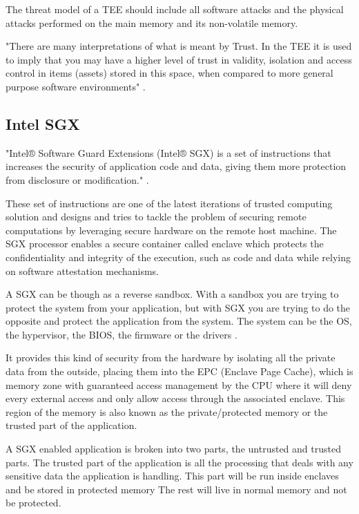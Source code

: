 The threat model of a \gls{TEE} should include all software attacks and the physical attacks performed on the main memory and its non-volatile memory.

"There are many interpretations of what is meant by Trust. In the \gls{TEE} it is used to imply that you may have a higher level of trust in validity, isolation and access control in items (assets) stored in this space, when compared to more general purpose software environments" \cite{tee:1}.

\subsection{Intel SGX} %
\label{ssec:Intel_sgx}


"Intel® Software Guard Extensions (Intel® SGX) is a set of instructions that increases the security of application code and data, giving them more protection from disclosure or modification." \cite{sgx:3}.

These set of instructions are one of the latest iterations of trusted computing solution and designs and tries to tackle the problem of securing remote computations by leveraging secure hardware on the remote host machine. The SGX processor enables a secure container called enclave which protects the confidentiality and integrity of the execution, such as code and data while relying on software attestation mechanisms.

A \gls{SGX} can be though as a reverse sandbox. With a sandbox you are trying to protect the system from your application, but with \gls{SGX} you are trying to do the opposite and protect the application from the system. The system can be the OS, the hypervisor, the BIOS, the firmware or the drivers \cite{sgx:2}.

It provides this kind of security from the hardware by isolating all the private data from the outside, placing them into the \gls{EPC} (Enclave Page Cache), which is memory zone with guaranteed access management by the CPU where it will deny every external access and only allow access through the associated enclave. This region of the memory is also known as the private/protected memory or the trusted part of the application.

A \gls{SGX} enabled application is broken into two parts, the untrusted and trusted parts. The trusted part of the application is all the processing that deals with any sensitive data the application is handling. This part will be run inside enclaves and be stored in protected memory The rest will live in normal memory and not be protected.

